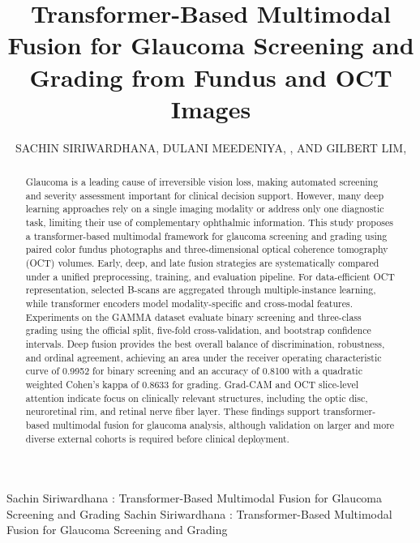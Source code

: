 \documentclass{ieeeaccess}
\begin{document}
\doi{}

\title{Transformer-Based Multimodal Fusion for Glaucoma Screening and Grading from Fundus and OCT Images}
\author{\uppercase{Sachin Siriwardhana},
    \uppercase{Dulani Meedeniya}, , AND \uppercase{Gilbert Lim}, }

\address[1]{Department of Computer Science \& Engineering, University of Moratuwa, Moratuwa 10400, Sri Lanka}
\address[2]{EyRIS Pte Ltd, 60 MacPherson Road, Block 1 Siemens Centre 05-08, Singapore 348615, Singapore}

\markboth
{Sachin Siriwardhana \headeretal: Transformer-Based Multimodal Fusion for Glaucoma Screening and Grading}
{Sachin Siriwardhana \headeretal: Transformer-Based Multimodal Fusion for Glaucoma Screening and Grading}



\begin{abstract}
    Glaucoma is a leading cause of irreversible vision loss, making automated screening and severity assessment important for clinical decision support. However, many deep learning approaches rely on a single imaging modality or address only one diagnostic task, limiting their use of complementary ophthalmic information. This study proposes a transformer-based multimodal framework for glaucoma screening and grading using paired color fundus photographs and three-dimensional optical coherence tomography (OCT) volumes. Early, deep, and late fusion strategies are systematically compared under a unified preprocessing, training, and evaluation pipeline. For data-efficient OCT representation, selected B-scans are aggregated through multiple-instance learning, while transformer encoders model modality-specific and cross-modal features. Experiments on the GAMMA dataset evaluate binary screening and three-class grading using the official split, five-fold cross-validation, and bootstrap confidence intervals. Deep fusion provides the best overall balance of discrimination, robustness, and ordinal agreement, achieving an area under the receiver operating characteristic curve of 0.9952 for binary screening and an accuracy of 0.8100 with a quadratic weighted Cohen's kappa of 0.8633 for grading. Grad-CAM and OCT slice-level attention indicate focus on clinically relevant structures, including the optic disc, neuroretinal rim, and retinal nerve fiber layer. These findings support transformer-based multimodal fusion for glaucoma analysis, although validation on larger and more diverse external cohorts is required before clinical deployment.
\end{abstract}
\end{document}
